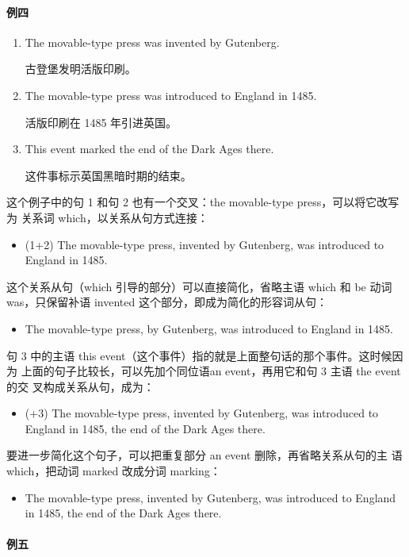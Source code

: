 \paragraph{例四}

\begin{enumerate}
\item The movable-type press was invented by Gutenberg.

  古登堡发明活版印刷。
\item The movable-type press was introduced to England in 1485.

  活版印刷在 1485 年引进英国。
\item This event marked the end of the Dark Ages there.

  这件事标示英国黑暗时期的结束。
\end{enumerate}

这个例子中的句 1 和句 2 也有一个交叉：the movable-type press，可以将它改写为
关系词 which，以关系从句方式连接：
\begin{itemize}
\item (1+2) The movable-type press,  invented by Gutenberg, was
  introduced to England in 1485.
\end{itemize}
这个关系从句（which 引导的部分）可以直接简化，省略主语 which 和 be 动词
was，只保留补语 invented 这个部分，即成为简化的形容词从句：
\begin{itemize}
\item The movable-type press,  by Gutenberg, was introduced to England
  in 1485.
\end{itemize}
句 3 中的主语 this event（这个事件）指的就是上面整句话的那个事件。这时候因为
上面的句子比较长，可以先加个同位语an event，再用它和句 3 主语 the event 的交
叉构成关系从句，成为：
\begin{itemize}
\item (+3) The movable-type press, invented by Gutenberg, was introduced to
  England in 1485,  the end of the Dark Ages there.
\end{itemize}
要进一步简化这个句子，可以把重复部分 an event 删除，再省略关系从句的主
语which，把动词 marked 改成分词 marking：
\begin{itemize}
\item   The movable-type press, invented by Gutenberg, was introduced to
  England in 1485,  the end of the Dark Ages there.
\end{itemize}

\paragraph{例五}

